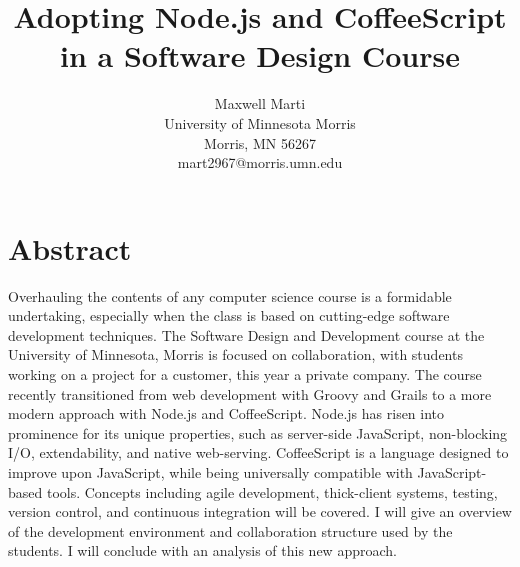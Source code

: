 \documentclass[12pt]{article}
\newcommand{\comment}[1]{{\bf \tt  {#1}}}
\begin{document}
\pagestyle{plain}
%




\title{Adopting Node.js and CoffeeScript in a Software Design Course}
%
%




\author{
Maxwell Marti \\
University of Minnesota Morris\\
Morris, MN 56267\\
mart2967@morris.umn.edu
}




\date{}




\maketitle
\thispagestyle{empty}


\section*{\centering Abstract}
Overhauling the contents of any computer science course is a formidable undertaking, especially when the class is based on cutting-edge software development techniques.
The Software Design and Development course at the University of Minnesota, Morris is focused on collaboration, with students working on a project for a customer, this year a private company. 
The course recently transitioned from web development with Groovy and Grails to a more modern approach with Node.js and CoffeeScript.
Node.js has risen into prominence for its unique properties, such as server-side JavaScript, non-blocking I/O, extendability, and native web-serving. 
CoffeeScript is a language designed to improve upon JavaScript, while being universally compatible with JavaScript-based tools. 
Concepts including agile development, thick-client systems, testing, version control, and continuous integration will be covered. 
I will give an overview of the development environment and collaboration structure used by the students. 
I will conclude with an analysis of this new approach.
\end{document}

